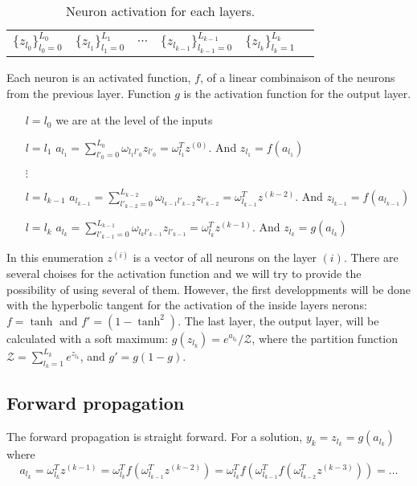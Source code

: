 \documentclass[final, paper=letter,5p,times,twocolumn]{elsarticle}
\begin{document}
\begin{table}[]
\centering
\caption{Neuron activation for each layers.}
\label{Layers_activations}
\begin{tabular}{llllll}
 $\{ z_{l_{0}}\}_{l_{0} = 0}^{L_{0}}$&  $\{ z_{l_{1}}\}_{l_{1} = 0}^{L_{1}}$ &  $\cdots$ & $\{ z_{l_{k-1}}\}_{l_{k-1} = 0}^{L_{k-1}}$ &  $\{ z_{l_{k}}\}_{l_{k} = 1}^{L_{k}}$ &  \\ 
\end{tabular}
\end{table}

Each neuron is an activated function, $f$, of a linear combinaison of the neurons from the previous layer. Function $g$ is the activation function for the output layer.

\begin{itemize}
    \item [$l = l_{0}$] we are at the level of the inputs
    \item [$l = l_{1}$] $a_{l_{1}} = \sum_{l'_{0} = 0}^{L_{0}} \omega_{l_{1}l'_{0}} z_{l'_{0}} = \omega_{l_{1}}^{T} z^{(0)}$. And $z_{l_{1}} = f(a_{l_{1}})$
    \item [$\vdots$]
    \item [$l = l_{k-1}$] $a_{l_{k-1}} = \sum_{l'_{k-2} = 0}^{L_{k-2}} \omega_{l_{k-1}l'_{k-2}} z_{l'_{k-2}} = \omega_{l_{k-1}}^{T} z^{(k-2)}$. And $z_{l_{k-1}} = f(a_{l_{k-1}})$
    \item [$l = l_{k}$] $a_{l_{k}} = \sum_{l'_{k-1} = 0}^{L_{k-1}} \omega_{l_{k}l'_{k-1}} z_{l'_{k-1}} = \omega_{l_{k}}^{T} z^{(k-1)}$. And $z_{l_{k}} = g(a_{l_{k}})$
\end{itemize}

In this enumeration $z^{(i)}$ is a vector of all neurons on the layer $(i)$. There are several choises for the activation function and we will try to provide the possibility of using several of them. However, the first developpments will be done with the hyperbolic tangent for the activation of the inside layers nerons: $f = \tanh$ and $f' = (1 - \tanh^{2})$. The last layer, the output layer, will be calculated with a soft maximum: $g(z_{l_{k}}) = e^{a_{l_{k}}} / \mathcal{Z}$, where the partition function $\mathcal{Z} = \sum_{l_{k} = 1}^{L_{k}} e^{z_{l_{k}}}$, and $g' = g(1 - g)$.
  
\subsection{Forward propagation}

The forward propagation is straight forward. For a solution, $y_{k} = z_{l_{k}} = g(a_{l_{k}})$ where
$$
a_{l_{k}} = \omega_{l_{k}}^{T} z^{(k-1)} = \omega_{l_{k}}^{T} f(\omega_{l_{k-1}}^{T} z^{(k-2)}) = \omega_{l_{k}}^{T} f(\omega_{l_{k-1}}^{T} f(\omega_{l_{k-2}}^{T} z^{(k-3)})) = \dots
$$
\end{document}

